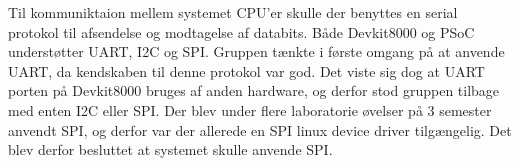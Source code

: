 Til kommuniktaion mellem systemet CPU'er skulle der benyttes en serial protokol til afsendelse og modtagelse af databits.
Både Devkit8000 og PSoC understøtter UART, I2C og SPI. Gruppen tænkte i første omgang på at anvende UART, da kendskaben til denne protokol var god.
Det viste sig dog at UART porten på Devkit8000 bruges af anden hardware, og derfor stod gruppen tilbage med enten I2C eller SPI. Der blev under flere 
laboratorie øvelser på 3 semester anvendt SPI, og derfor var der allerede en SPI linux device driver tilgængelig. Det blev derfor besluttet at systemet 
skulle anvende SPI.    